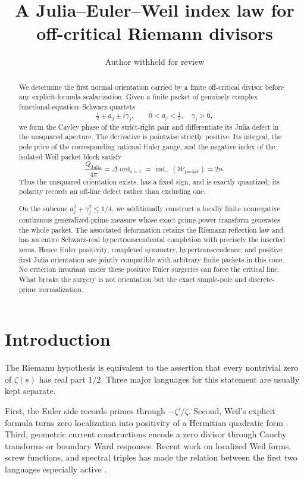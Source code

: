 \documentclass[11pt]{article}
\title{\textbf{A Julia--Euler--Weil index law for off-critical Riemann divisors}}
\author{Author withheld for review}
\date{}
\newcommand{\WW}{\mathcal W}
\newcommand{\ord}{\operatorname{ord}}
\newcommand{\indm}{\operatorname{ind}_{-}}
\begin{document}
\maketitle

\begin{abstract}
We determine the first normal orientation carried by a finite off-critical
divisor before any explicit-formula scalarization.  Given a finite packet of
genuinely complex functional-equation--Schwarz quartets
\[
 \tfrac12\pm a_j\pm i\gamma_j,\qquad
 0<a_j<\tfrac12,\quad \gamma_j>0,
\]
we form the Cayley phase of the strict-right pair and differentiate its
Julia defect in the unsquared aperture.  The derivative is pointwise
strictly positive.  Its integral, the pole price of the corresponding
rational Euler gauge, and the negative index of the isolated Weil packet
block satisfy
\[
 \frac{Q_{\mathrm{Julia}}}{4\pi}
   =\Delta\ord_{s=1}
   =\indm(\WW_{\mathrm{packet}})
   =2n.
\]
Thus the unsquared orientation exists, has a fixed sign, and is exactly
quantized; its polarity records an off-line defect rather than excluding
one.

On the subcone \(a_j^2+\gamma_j^2\leq1/4\), we additionally construct a
locally finite nonnegative continuous generalized-prime measure whose exact
prime-power transform generates the whole packet.  The associated
deformation retains the Riemann reflection law and has an entire
Schwarz-real hypertranscendental completion with precisely the inserted
zeros.  Hence Euler positivity, completed symmetry, hypertranscendence, and
positive first Julia orientation are jointly compatible with arbitrary
finite packets in this cone.  No criterion invariant under these positive
Euler surgeries can force the critical line.  What breaks the surgery is
not orientation but the exact simple-pole and discrete-prime normalization.
\end{abstract}

\section{Introduction}

The Riemann hypothesis is equivalent to the assertion that every
nontrivial zero of \(\zeta(s)\) has real part \(1/2\).  Three major
languages for this statement are usually kept separate.

First, the Euler side records primes through
\(-\zeta'/\zeta\).  Second, Weil's explicit formula turns zero localization
into positivity of a Hermitian quadratic form
\cite{Weil1952,Bombieri2000}.  Third, geometric current constructions
encode a zero divisor through Cauchy transforms or boundary Ward
responses.  Recent work on localized Weil forms, screw functions, and
spectral triples has made the relation between the first two languages
especially active \cite{ConnesConsani2021,CCM2025,Suzuki2026}.
\end{document}
